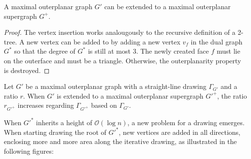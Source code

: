 \begin{lemma}
	A maximal outerplanar graph $G'$ can be extended to a maximal outerplanar supergraph $G^+$.\label{l:outerplanar-supergraph}
\end{lemma}
\begin{proof}
	The vertex insertion works analougously to the recursive definition of a 2-tree. A new vertex can be added to  by adding a new vertex $v_f$ in the dual graph $G^*$ so that the degree of $G^*$ is still at most 3. The newly created face $f$ must lie on the outerface and must be a triangle. Otherwise, the outerplanarity property is destroyed. 
\end{proof}

\begin{observation}
	Let $G'$ be a maximal outerplanar graph with a straight-line drawing $\Gamma_{G'}$ and a ratio $r$. When $G'$ is extended to a maximal outerplanar supergraph $G'^+$, the ratio $r_{G'^+}$ increases regarding $\Gamma_{G'^+}$ based on $\Gamma_{G'}$.\label{ob:area_leads_to_ratio_increase}
\end{observation}
When $G'^*$ inherits a height of $\mathcal{O}(\log n)$, a new problem for a drawing emerges. When starting drawing the root of $G'^*$, new vertices are added in all directions, enclosing more and more area along the iterative drawing, as illustrated in the following figures:
